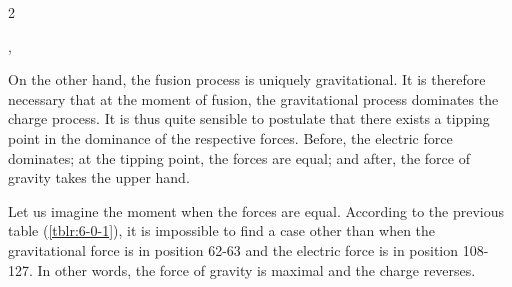 \begin{multicols}{2}
	\begin{table}[H]
		\centering
		\caption{\footnotesize{\textbf{Charge vs mass}}}
		\label{tblr:6-0-1},
	\end{table}
	
	On the other hand, the fusion process is uniquely gravitational. It is therefore necessary that at the moment of fusion, the gravitational process dominates the charge process. It is thus quite sensible to postulate that there exists a tipping point in the dominance of the respective forces. Before, the electric force dominates; at the tipping point, the forces are equal; and after, the force of gravity takes the upper hand.
	
	Let us imagine the moment when the forces are equal. According to the previous table (\ref{tblr:6-0-1}), it is impossible to find a case other than when the gravitational force is in position 62-63 and the electric force is in position 108-127. In other words, the force of gravity is maximal and the charge reverses.
	

\end{multicols}
